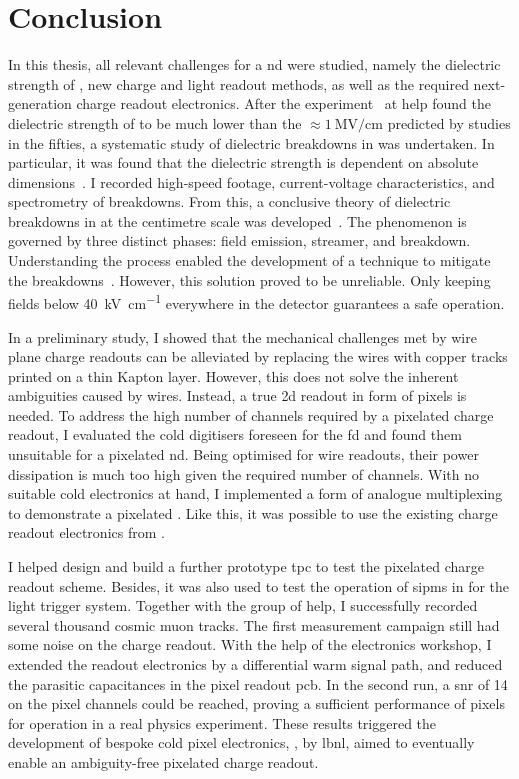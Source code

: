 \chapter{Conclusion}
\label{chap:conclusion}

In this thesis, all relevant challenges for a \gls{nd} \lartpc{} were studied, namely the dielectric strength of \lar{}, new charge and light readout methods, as well as the required next-generation charge readout electronics.
After the \AT{} experiment~\cite{AT} at \gls{help} found the dielectric strength of \lar{} to be much lower than the $\approx \SI{1}{\mega\volt\per\centi\metre}$ predicted by studies in the fifties, a systematic study of dielectric breakdowns in \lar{} was undertaken.
In particular, it was found that the dielectric strength is dependent on absolute dimensions~\cite{breakdown_14}.
I recorded high-speed footage, current-voltage characteristics, and spectrometry of breakdowns.
From this, a conclusive theory of dielectric breakdowns in \lar{} at the centimetre scale was developed~\cite{breakdown_16}.
The phenomenon is governed by three distinct phases: field emission, streamer, and breakdown.
Understanding the process enabled the development of a technique to mitigate the breakdowns~\cite{latex}.
However, this solution proved to be unreliable.
Only keeping fields below \SI{40}{\kilo\volt\per\centi\metre} everywhere in the detector guarantees a safe operation.

In a preliminary study, I showed that the mechanical challenges met by wire plane charge readouts can be alleviated by replacing the wires with copper tracks printed on a thin Kapton layer.
However, this does not solve the inherent ambiguities caused by wires.
Instead, a true \gls{2d} readout in form of pixels is needed.
To address the high number of channels required by a pixelated charge readout, I evaluated the cold digitisers foreseen for the \dune{} \gls{fd} and found them unsuitable for a pixelated \gls{nd}.
Being optimised for wire readouts, their power dissipation is much too high given the required number of channels.
With no suitable cold electronics at hand, I implemented a form of analogue multiplexing to demonstrate a pixelated \lartpc{}.
Like this, it was possible to use the existing charge readout electronics from \AT{}.

I helped design and build a further prototype \gls{tpc} to test the pixelated charge readout scheme.
Besides, it was also used to test the operation of \glspl{sipm} in \lar{} for the light trigger system.
Together with the \lar{} group of \gls{help}, I successfully recorded several thousand cosmic muon tracks.
The first measurement campaign still had some noise on the charge readout.
With the help of the electronics workshop, I extended the \AT{} readout electronics by a differential warm signal path, and reduced the parasitic capacitances in the pixel readout \gls{pcb}.
In the second run, a \gls{snr} of \num{14} on the pixel channels could be reached, proving a sufficient performance of pixels for operation in a real physics experiment.
These results triggered the development of bespoke cold pixel electronics, \larpix{}, by \gls{lbnl}, aimed to eventually enable an ambiguity-free pixelated \lartpc{} charge readout.

